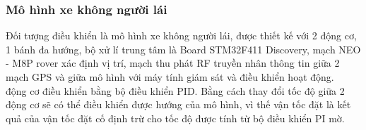 \documentclass[a4paper, 12pt]{article}
\begin{document}
	
	\newpage
	\subsubsection{Mô hình xe không người lái}
	\hspace{0.5cm}
	Đối tượng điều khiển là mô hình xe không người lái, được thiết kế với 2 động cơ, 1 bánh đa hướng, bộ xử lí trung tâm là Board STM32F411 Discovery, mạch NEO - M8P rover xác định vị trí, mạch thu phát RF truyền nhân thông tin giữa 2 mạch GPS và giữa mô hình với máy tính giám sát và điều khiển hoạt động.\\ động cơ điều khiển bằng bộ điều khiển PID. Bằng cách thay đổi tốc độ giữa 2 động cơ sẽ có thể điều khiển được hướng của mô hình, vì thế vận tốc đặt là kết quả của vận tốc đặt cố định trừ cho tốc độ được tính từ bộ điều khiển PI mờ.\\
\end{document}
